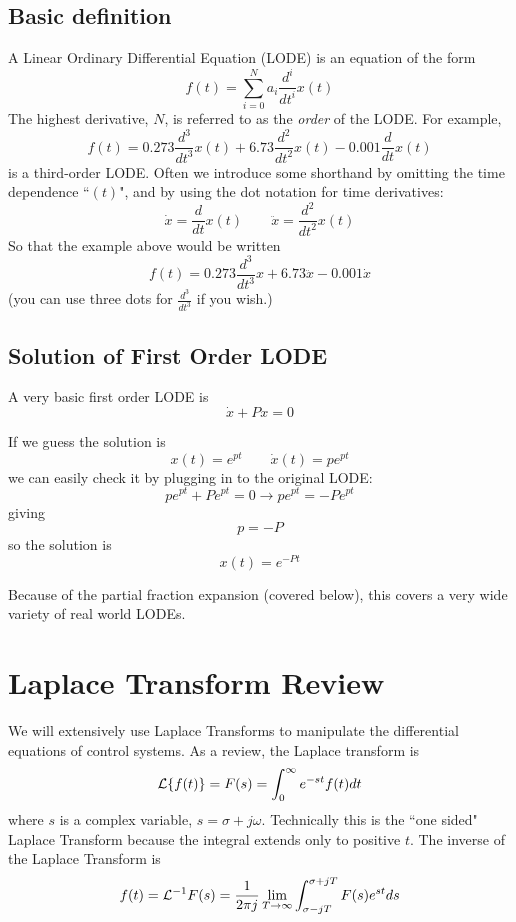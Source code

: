 \subsection{Basic definition}

A Linear Ordinary Differential Equation (LODE) is an equation of the form
\[
f(t) = \sum_{i=0}^{N} a_i\frac{d^i}{dt^i}x(t)
\]
The highest derivative, $N$, is referred to as the {\it order} of the LODE.  For example,
\[
f(t) = 0.273\frac{d^3}{dt^3}x(t) + 6.73\frac{d^2}{dt^2}x(t) - 0.001\frac{d}{dt}x(t)
\]
is a third-order LODE.   Often we introduce some shorthand by omitting the time dependence ``$(t)$", and by using the dot notation for time derivatives:
\[
\dot{x} = \frac{d}{dt}x(t)  \qquad \ddot{x} = \frac{d^2}{dt^2}x(t)
\]
So that the example above would be written
\[
f(t) =0.273\frac{d^3}{dt^3}x + 6.73\ddot{x} - 0.001\dot{x}
\]
(you can use three dots for $\frac{d^3}{dt^3}$ if you wish.)



\subsection{Solution of First Order LODE}

A very basic  first order LODE is
\[
\dot{x} + Px = 0
\]

If we guess the solution is
\[
x(t) = e^{pt} \qquad \dot{x}(t) = pe^{pt}
\]
we can easily check it by plugging in to the original LODE:
\[
pe^{pt} +Pe^{pt} = 0 \to pe^{pt} = -Pe^{pt}
\]
giving
\[
p = -P
\]
so the solution is
\[
x(t) = e^{-Pt}
\]

Because of the partial fraction expansion (covered below), this covers a very wide variety of real world LODEs.


\section{Laplace Transform Review}

We will extensively use Laplace Transforms to manipulate the differential equations of control systems.  As a review, the Laplace transform is
\[
\mathcal{L} \{f(t)\} = F(s) =  \int_{0}^{\infty} e^{-st}f(t)dt
\]
where $s$ is a complex variable, $s=\sigma + j \omega$.  Technically this is the ``one sided" Laplace Transform because the integral extends only to positive $t$.
The inverse of the Laplace Transform is
\[
f(t) = \mathcal{L}^{-1}F(s) = \frac{1}{2\pi j} \lim_{T\to\infty} \int_{\sigma - j T}^{\sigma + jT}F(s) e^{st}ds
\]

